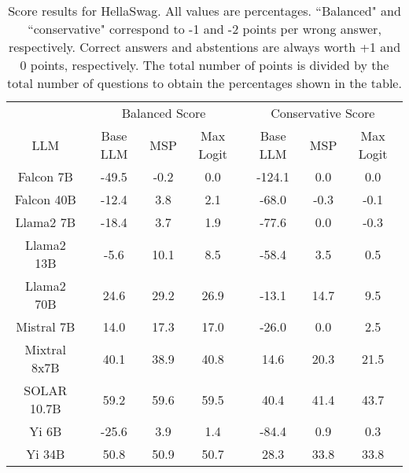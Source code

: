 \begin{table*}
\centering
\begin{tabular}{c|c|c|c|c|c|c}
& \multicolumn{3}{c|}{Balanced Score} & \multicolumn{3}{c}{Conservative Score} \\ 
LLM & Base LLM & MSP & Max Logit & Base LLM & MSP & Max Logit\\ \hline
Falcon 7B & -49.5 & -0.2 & 0.0 & -124.1 & 0.0 & 0.0\\
Falcon 40B & -12.4 & 3.8 & 2.1 & -68.0 & -0.3 & -0.1\\
Llama2 7B & -18.4 & 3.7 & 1.9 & -77.6 & 0.0 & -0.3\\
Llama2 13B & -5.6 & 10.1 & 8.5 & -58.4 & 3.5 & 0.5\\
Llama2 70B & 24.6 & 29.2 & 26.9 & -13.1 & 14.7 & 9.5\\
Mistral 7B & 14.0 & 17.3 & 17.0 & -26.0 & 0.0 & 2.5\\
Mixtral 8x7B & 40.1 & 38.9 & 40.8 & 14.6 & 20.3 & 21.5\\
SOLAR 10.7B & 59.2 & 59.6 & 59.5 & 40.4 & 41.4 & 43.7\\
Yi 6B & -25.6 & 3.9 & 1.4 & -84.4 & 0.9 & 0.3\\
Yi 34B & 50.8 & 50.9 & 50.7 & 28.3 & 33.8 & 33.8\\
\hline
\end{tabular}
\caption{Score results for HellaSwag. All values are percentages. ``Balanced" and ``conservative" correspond to -1 and -2 points per wrong answer, respectively. Correct answers and abstentions are always worth +1 and 0 points, respectively. The total number of points is divided by the total number of questions to obtain the percentages shown in the table.}
\label{tab:hellaswag_score}
\end{table*}
